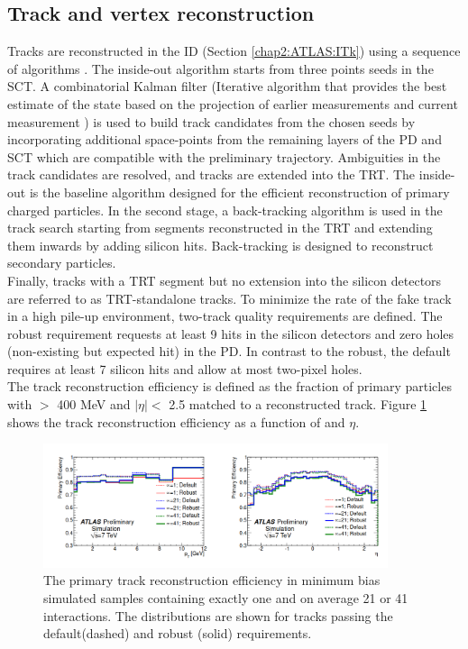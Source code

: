 \subsection{Track and vertex reconstruction}
\label{chap2:Objects:Trk}
Tracks are reconstructed in the ID (Section \ref{chap2:ATLAS:ITk}) using a sequence of algorithms \cite{Track_Reco, New_Trk}. The inside-out algorithm starts from three points seeds in the SCT. A combinatorial Kalman filter (Iterative algorithm that provides the best estimate of the state based on the projection of earlier measurements and current measurement \cite{Kalman}) is used to build track candidates from the chosen seeds by incorporating additional space-points from the remaining layers of the PD and SCT which are compatible with the preliminary trajectory. Ambiguities in the track candidates are resolved, and tracks are extended into the TRT. The inside-out is the baseline algorithm designed for the efficient reconstruction of primary charged particles. In the second stage, a back-tracking algorithm is used in the track search starting from segments reconstructed in the TRT and extending them inwards by adding silicon hits. Back-tracking is designed to reconstruct secondary particles. \\
Finally, tracks with a TRT segment but no extension into the silicon detectors are referred to as TRT-standalone tracks. To minimize the rate of the fake track in a high pile-up environment, two-track quality requirements are defined. The robust requirement requests at least 9 hits in the silicon detectors and zero holes (non-existing but expected hit) in the PD. In contrast to the robust, the default requires at least 7 silicon hits and allow at most two-pixel holes.\\
The track reconstruction efficiency is defined as the fraction of primary particles with \pT $>$ 400 MeV and $|\eta|<$ 2.5 matched to a reconstructed track. Figure \ref{fig:chap2:Objects:Trk:Eff} shows the track reconstruction efficiency as a function of \pT and $\eta$.
\begin{figure}[htbp]
    \centering
    \includegraphics[width=0.9\textwidth]{Ch2/Img/Track_reco_eff.png}
    \caption{The primary track reconstruction efficiency in minimum bias simulated samples containing exactly one and on average 21 or 41 interactions. The distributions are shown for tracks passing the default(dashed) and robust (solid) requirements.}
    \label{fig:chap2:Objects:Trk:Eff}
\end{figure}
